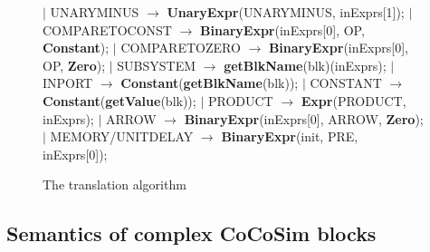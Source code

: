 \documentclass{article}
\begin{document}
\begin{figure}
\begin{algorithmic}
\State $\mid$ UNARYMINUS $\rightarrow$ \textbf{UnaryExpr}(UNARYMINUS, inExprs[1]);
\State $\mid$ COMPARETOCONST $\rightarrow$ \textbf{BinaryExpr}(inExprs[0], OP, \textbf{Constant});
\State $\mid$ COMPARETOZERO $\rightarrow$ \textbf{BinaryExpr}(inExprs[0], OP, \textbf{Zero});
\State $\mid$ SUBSYSTEM $\rightarrow$ \textbf{getBlkName}(blk)(inExprs);
\State $\mid$ INPORT $\rightarrow$ \textbf{Constant}(\textbf{getBlkName}(blk));
\State $\mid$ CONSTANT $\rightarrow$ \textbf{Constant}(\textbf{getValue}(blk));
\State $\mid$ PRODUCT $\rightarrow$ \textbf{Expr}(PRODUCT, inExprs);
\State $\mid$ ARROW $\rightarrow$ \textbf{BinaryExpr}(inExprs[0], ARROW, \textbf{Zero});
\State $\mid$ MEMORY/UNITDELAY $\rightarrow$ \textbf{BinaryExpr}(init, PRE, inExprs[0]);
\EndFunction
\end{algorithmic}
\caption{The translation algorithm}
\end{figure}

\subsection{Semantics of complex CoCoSim blocks}
\end{document}
